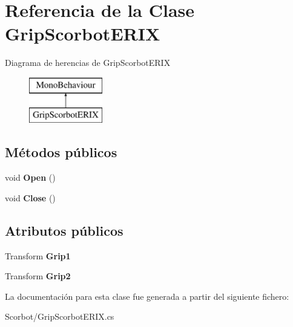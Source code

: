\hypertarget{class_grip_scorbot_e_r_i_x}{}\section{Referencia de la Clase Grip\+Scorbot\+E\+R\+IX}
\label{class_grip_scorbot_e_r_i_x}
Diagrama de herencias de Grip\+Scorbot\+E\+R\+IX\begin{figure}[H]
\begin{center}
\leavevmode
\includegraphics[height=2.000000cm]{class_grip_scorbot_e_r_i_x}
\end{center}
\end{figure}
\subsection*{Métodos públicos}
\begin{DoxyCompactItemize}
\item 
\mbox{\label{class_grip_scorbot_e_r_i_x_a0c3b7287d1a56a1e7e00228a0dbe1a34}} 
void {\bfseries Open} ()
\item 
\mbox{\label{class_grip_scorbot_e_r_i_x_a05f7c7720d01ab46bd5cd499b5f83646}} 
void {\bfseries Close} ()
\end{DoxyCompactItemize}
\subsection*{Atributos públicos}
\begin{DoxyCompactItemize}
\item 
\mbox{\label{class_grip_scorbot_e_r_i_x_a2facabd0fc50809175ecd2d6e5d96a23}} 
Transform {\bfseries Grip1}
\item 
\mbox{\label{class_grip_scorbot_e_r_i_x_adedacde16a4a9fb8a5ba5431a54beee4}} 
Transform {\bfseries Grip2}
\end{DoxyCompactItemize}


La documentación para esta clase fue generada a partir del siguiente fichero\+:\begin{DoxyCompactItemize}
\item 
Scorbot/Grip\+Scorbot\+E\+R\+I\+X.\+cs\end{DoxyCompactItemize}
